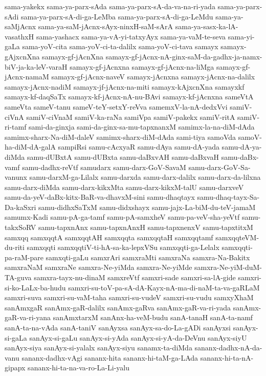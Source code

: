{sama-yakekx
sama-ya-parx-sAda
sama-ya-parx-sA-da-va-na-ri-yada
sama-ya-parx-sAdi
sama-ya-parx-sA-di-ga-LeMba
sama-ya-parx-sA-di-ga-LeMdu
sama-ya-saMjAcnx
sama-ya-saM-jAcnx-sAyx-ninxH-saM-sArA
sama-ya-sasx-ka-lA-vasathxH
sama-yashacx
sama-ya-vA-yi-tatxyAyx
sama-ya-vaM-te-seva
sama-yi-gaLa
sama-yoV-cita
sama-yoV-ci-ta-dalilx
sama-yoV-ci-tava
samayx
samayx-gAjxcnXna
samayx-gf-jAcnXna
samayx-gf-jAcnx-nA-ginx-saM-da-gadhx-ja-namx-biV-ja-ka-leV-varaH
samayx-gf-jAcnxna
samayx-gf-jAcnx-na-liMga
samayx-gf-jAcnx-namaM
samayx-gf-jAcnx-naveV
samayx-jAcnxna
samayx-jAcnx-na-dalilx
samayx-jAcnx-nadiM
samayx-jf-jAcnx-na-miti
samayx-kAjxcnXna
samayxkf
samayx-kf-daqSaTx
samayx-kf-jAcnx-nA-nu-BAvi
samayx-kf-jAcnxna
sameVtA
sameVta
sameV-tanu
sameV-teY-setxY-reVva
samemxV-la-nA-dedxVvi
samiV-ciVnA
samiV-ciVnaM
samiV-ka-raNa
samiVpa
samiV-pakekx
samiV-ritA
samiV-ri-tamf
sami-da-ginxja
sami-da-ginx-sa-mu-tapxnanxM
samimx-la-na-diM-dAda
samimx-sharx-Na-diM-daleV
samimx-sharx-diM-dAda
sami-tiya
samoVda
samoV-ha-diM-dA-galA
sampiRsi
samu-cAcxyaR
samu-dAya
samu-dA-yada
samu-dA-ya-diMda
samu-dUBxtA
samu-dUBxta
samu-daBxvAH
samu-daBxvaH
samu-daBx-vamf
samu-dadhx-reVtf
samudarx
samu-darx-GoV-SavaM
samu-darx-GoV-Sa-vanunx
samu-darxM-ga-Lilalx
samu-darxda
samu-darx-dalilx
samu-darx-da-lilxna
samu-darx-diMda
samu-darx-kikxMta
samu-darx-kikxM-talU
samu-darxveV
samu-da-yeV-daBx-kitx-BaR-va-dhavxM-sini
samu-dhaqtayx
samu-dhaq-tayx-Sa-Da-kaSxri
samu-didhxSaTxM
samu-didxshayx
samu-jajx-La-biM-du-teV-jamaM
samumx-Kadi
samu-pA-ga-tamf
samu-pA-samxheV
samu-pa-veV-sha-yeVtf
samu-takxSoRV
samu-tapxnAnx
samu-tapxnAnxH
samu-tapxnenxV
samu-tapxtitxM
samxqq
samxqqtA
samxqqtAH
samxqqta
samxqqtaH
samxqqtamf
samxqqteVM-du-riti
samxqqti
samxqqtiV-ti-hA-sa-ka-lepxVSu
samxqqti-ga-Lelalx
samxqqti-pa-raM-pare
samxqti-gaLu
samxrAri
samxraMti
samxraNa
samxra-Na-Bakitx
samxraNaM
samxraNe
samxra-Ne-yiMda
samxra-Ne-yiMde
samxra-Ne-yiM-duM-TA-guva
samxra-tayx-nu-dinaM
samxreVtf
samxri-sade
samxri-sa-lA-gide
samxri-si-ko-LaLx-ba-hudu
samxri-su-toV-pa-sA-dA-Kayx-nA-ma-di-naM-ta-va-gaRLaM
samxri-suva
samxri-su-vaM-taha
samxri-su-vudeV
samxri-su-vudu
samxyXhaM
sanAmxgaR
sanAmx-gaR-dalilx
sanAmx-gaRva
sanAmx-gaR-va-ri-yada
sanAmx-gaR-va-ri-yana
sanAmxtarxM
sanAnx-ha-veM-budu
sanA-tanaH
sanA-ta-namf
sanA-ta-na-vAda
sanA-taniV
sanAyxsa
sanAyx-sa-do-La-gADi
sanAyxsi
sanAyx-si-gaLa
sanAyx-si-gaLu
sanAyx-si-yAda
sanAyx-si-yA-da-DeVnu
sanAyx-siyU
sanAyx-siya
sanAyx-si-yalalx
sanAyx-siyu
sanamx-ta-diMda
sananx-dadhx-nA-da-vanu
sananx-dadhx-vAgi
sananx-hita
sananx-hi-taM-ga-LAda
sananx-hi-ta-nA-gipapx
sananx-hi-ta-na-va-ro-La-Li-yalu
}
